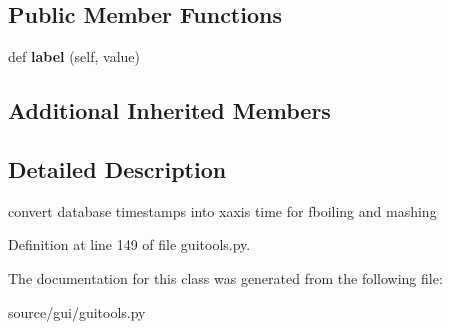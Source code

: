 \subsection*{Public Member Functions}
\begin{DoxyCompactItemize}
\item 
\mbox{\label{classguitools_1_1_boil_mash_time_scale_draw_ad5f035695c60248d84f1e0b026f17b8b}} 
def {\bfseries label} (self, value)
\end{DoxyCompactItemize}
\subsection*{Additional Inherited Members}


\subsection{Detailed Description}
convert database timestamps into xaxis time for fboiling and mashing 

Definition at line 149 of file guitools.\+py.



The documentation for this class was generated from the following file\+:\begin{DoxyCompactItemize}
\item 
source/gui/guitools.\+py\end{DoxyCompactItemize}
